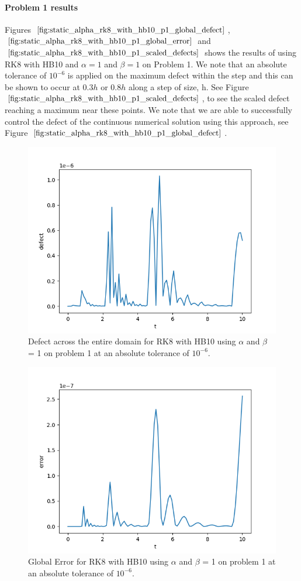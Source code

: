 \paragraph{Problem 1 results}
Figures $\ref{fig:static_alpha_rk8_with_hb10_p1_global_defect}$, $\ref{fig:static_alpha_rk8_with_hb10_p1_global_error}$ and $\ref{fig:static_alpha_rk8_with_hb10_p1_scaled_defects}$ shows the results of using RK8 with HB10 and $\alpha = 1$ and $\beta = 1$ on Problem 1. We note that an absolute tolerance of $10^{-6}$ is applied on the maximum defect within the step and this can be shown to occur at $0.3h$ or $0.8h$ along a step of size, h. See Figure $\ref{fig:static_alpha_rk8_with_hb10_p1_scaled_defects}$, to see the scaled defect reaching a maximum near these points. We note that we are able to successfully control the defect of the continuous numerical solution using this approach, see Figure $\ref{fig:static_alpha_rk8_with_hb10_p1_global_defect}$. 
\begin{figure}[H]
\centering
\includegraphics[width=0.7\linewidth]{./figures/static_alpha_rk8_with_hb10_p1_global_defect}
\caption{Defect across the entire domain for RK8 with HB10 using $\alpha$ and $\beta$ = 1 on problem 1 at an absolute tolerance of $10^{-6}$.}
\label{fig:static_alpha_rk8_with_hb10_p1_global_defect}
\end{figure}

\begin{figure}[H]
\centering
\includegraphics[width=0.7\linewidth]{./figures/static_alpha_rk8_with_hb10_p1_global_error}
\caption{Global Error for RK8 with HB10 using $\alpha$ and $\beta$ = 1 on problem 1 at an absolute tolerance of $10^{-6}$.}
\label{fig:static_alpha_rk8_with_hb10_p1_global_error}
\end{figure}


